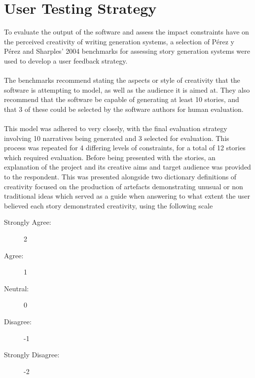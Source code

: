 \documentclass[letterpaper]{article}
\begin{document}
\section{User Testing Strategy}
To evaluate the output of the software and assess the impact constraints have on the perceived creativity of writing generation systems, a selection of P\'erez y P\'erez and Sharples' 2004 benchmarks for assessing story generation systems were used to develop a user feedback strategy.\\
\\The benchmarks recommend stating the aspects or style of creativity that the software is attempting to model, as well as the audience it is aimed at. They also recommend that the software be capable of generating at least 10 stories, and that 3 of these could be selected by the software authors for human evaluation.\\ 
\\This model was adhered to very closely, with the final evaluation strategy involving 10 narratives being generated and 3 selected for evaluation. This process was repeated for 4 differing levels of constraints, for a total of 12 stories which required evaluation. Before being presented with the stories, an explanation of the project and its creative aims and target audience was provided to the respondent. This was presented alongside two dictionary definitions of creativity focused on the production of artefacts demonstrating unusual or non traditional ideas which served as a guide when answering to what extent the user believed each story demonstrated creativity, using the following scale
\begin{description}
\item[Strongly Agree:] 2
\item[Agree:] 1
\item[Neutral:] 0
\item[Disagree:] -1
\item[Strongly Disagree:] -2
\end{description} 
\end{document}
